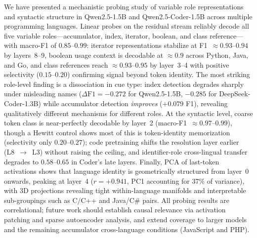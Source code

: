 
We have presented a mechanistic probing study of variable role representations
and syntactic structure in Qwen2.5-1.5B and Qwen2.5-Coder-1.5B across multiple
programming languages. Linear probes on the residual stream reliably decode all
five variable roles---accumulator, index, iterator, boolean, and class
reference---with macro-F1 of $0.85$--$0.99$: iterator representations stabilize
at F1~$\approx 0.93$--$0.94$ by layers~8--9, boolean usage context is decodable
at $\approx 0.9$ across Python, Java, and Go, and class references reach
$\approx 0.93$--$0.95$ by layer~3--4 with positive selectivity ($0.15$--$0.20$)
confirming signal beyond token identity. The most striking role-level finding is
a dissociation in cue type: index detection degrades sharply under misleading
names ($\Delta\text{F1} = {-}0.272$ for Qwen2.5-1.5B, $-0.285$ for
DeepSeek-Coder-1.3B) while accumulator detection \emph{improves}
($+0.079$ F1), revealing qualitatively different mechanisms for different roles.
At the syntactic level, coarse token class is near-perfectly decodable by
layer~2 (macro-F1~$\approx 0.97$--$0.99$), though a Hewitt control shows most
of this is token-identity memorization (selectivity only $0.20$--$0.27$); code
pretraining shifts the resolution layer earlier (L8~$\rightarrow$~L3) without
raising the ceiling, and identifier-role cross-lingual transfer degrades to
$0.58$--$0.65$ in Coder's late layers. Finally, PCA of last-token activations
shows that language identity is geometrically structured from layer~0 onwards,
peaking at layer~4 ($r = {+}0.941$, PC1 accounting for $37\%$ of variance),
with 3D projections revealing tight within-language manifolds and interpretable
sub-groupings such as C/C++ and Java/C\# pairs. All probing results are
correlational; future work should establish causal relevance via activation
patching and sparse autoencoder analysis, and extend coverage to larger models
and the remaining accumulator cross-language conditions (JavaScript and PHP).
